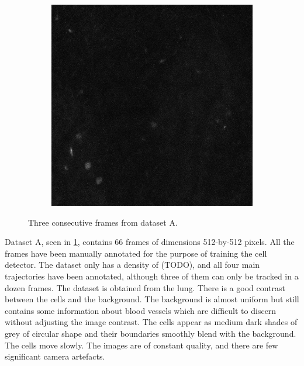 \begin{figure}[h]
\begin{subfigure}{.32\textwidth}
   		\end{subfigure}
   		\hfill
   		\begin{subfigure}{.32\textwidth}
   		\includegraphics[width=\textwidth]{images/series30green021}
   		\end{subfigure}
   		\caption{Three consecutive frames from dataset A.}
   		\label{fig:data_datasetA}
   	\end{figure}
   	  	
   	Dataset A, seen in \cref{fig:data_datasetA}, contains 66 frames of dimensions 512-by-512 pixels. All the frames have been manually annotated for the purpose of training the cell detector. The dataset only has a density of (TODO), and all four main trajectories have been annotated, although three of them can only be tracked in a dozen frames. The dataset is obtained from the lung. There is a good contrast between the cells and the background. The background is almost uniform but still contains some information about blood vessels  which are difficult to discern without adjusting the image contrast. The cells appear as medium dark shades of grey of circular shape and their boundaries smoothly blend with the background. The cells move slowly. The images are of constant quality, and there are few significant camera artefacts.
   	

